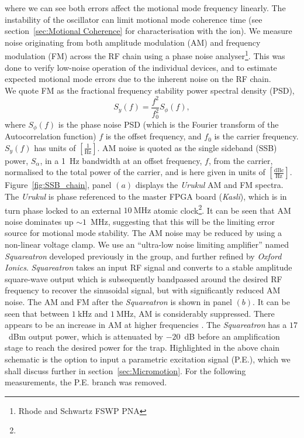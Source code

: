     where we can see both errors affect the motional mode frequency linearly.
    The instability of the oscillator can limit motional mode coherence time (see section~\ref{sec:Motional Coherence} for characterisation with the ion). We measure noise originating from both amplitude modulation (AM) and frequency modulation (FM) across the RF chain using a phase noise analyser\footnote{Rhode and Schwartz FSWP PNA}.
    This was done to verify low-noise operation of the individual devices, and to estimate expected motional mode errors due to the inherent noise on the RF chain. \\
    We quote FM as the fractional frequency stability power spectral density (PSD), 
    \begin{equation}
    S_y(f) = \frac{f^2}{f_0^2} S_{\phi}(f),
    \end{equation}
    where $S_{\phi}(f)$ is the phase noise PSD (which is the Fourier transform of the Autocorrelation function) $f$ is the offset frequency, and $f_0$ is the carrier frequency. $S_y(f)$ has units of
    $\left[\frac{1}{\unit{\hertz}}\right]$. AM noise is quoted as the single sideband (SSB) power, $S_\alpha$, in a 1~Hz bandwidth at an offset frequency, $f$, from the carrier, normalised to the total power of the carrier, and is here given in units of $\left[\frac{\mathrm{dBc}}{\unit{\hertz}}\right]$. \\
    Figure~\ref{fig:SSB_chain}, panel $(a)$ displays the \emph{Urukul} AM and FM spectra. The \emph{Urukul} is phase referenced to the master FPGA board (\emph{Kasli}), which is in turn phase locked to an external $10~\unit{\mega\hertz}$ atomic clock\footnote{}. It can be seen that AM noise dominates up $\sim 1$~MHz, suggesting that this will be the limiting error source for motional mode stability.
    The AM noise may be reduced by using a non-linear voltage clamp. We use an ``ultra-low noise limiting amplifier'' named
    \emph{Squareatron} developed previously in the group, and further refined by \emph{Oxford Ionics}. 
    \emph{Squareatron} takes an input RF signal and converts to a stable amplitude square-wave output which is subsequently bandpassed around the desired RF frequency to recover the sinusoidal signal, but with significantly reduced AM noise.
    The AM and FM after the \emph{Squareatron} is shown in panel $(b)$.
    It can be seen that between $1~\unit{\kilo\hertz}$ and $1~\unit{\mega\hertz}$, AM is considerably suppressed. There appears to be an increase in AM at higher frequencies . The \emph{Squareatron} has a $17$~dBm output power, which is attenuated by $-20$~dB before an amplification stage to reach the desired power for the trap. Highlighted in the above chain schematic is the option to input a parametric excitation signal (P.E.), which we shall discuss further in section~\ref{sec:Micromotion}. For the following measurements, the P.E. branch was removed.
